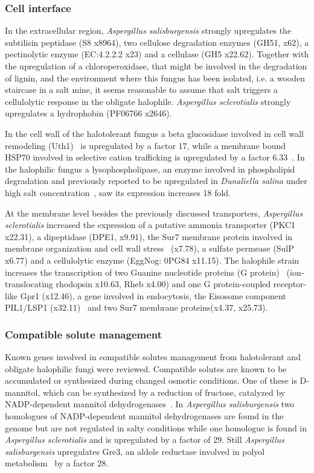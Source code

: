 \documentclass[jof,article,submit,moreauthors,pdftex,10pt,a4paper]{Definitions/mdpi}
\newcommand{\phiSp}{\textit{Aspergillus salisburgensis}}
\newcommand{\phiScl}{\textit{Aspergillus sclerotialis}}
\begin{document}
  
\subsubsection{Cell interface}

In the extracellular region, \phiSp{} strongly upregulates the subtilisin peptidase (S8 x8964), two cellulose degradation enzymes (GH51, x62), a pectinolytic enzyme (EC:4.2.2.2 x23) and a cellulase (GH5 x22.62). Together with the upregulation of a chloroperoxidase, that might be involved in the degradation of lignin, and the environment where this fungus has been isolated, i.e. a wooden staircase in a salt mine, it seems reasonable to assume that salt triggers a cellulolytic response in the obligate halophile. \phiScl{} strongly upregulates a hydrophobin (PF06766 x2646).

In the cell wall of the halotolerant fungus a beta glucosidase involved in cell wall remodeling (Uth1)~\cite{Kuznetsov2013} is upregulated by a factor 17, while a membrane bound HSP70 involved in selective cation trafficking is upregulated by a factor 6.33~\cite{Arispe2000}. In the halophilic fungus a lysophospholipase, an enzyme involved in phospholipid degradation and previously reported to be upregulated in \textit{Dunaliella salina} under high salt concentration~\cite{Katz2007}, saw its expression increases 18 fold.

At the membrane level besides the previously discussed transporters,  \phiScl{} increased the expression of a putative ammonia transporter (PKC1 x22.31), a dipeptidase (DPE1, x9.91), the Sur7 membrane protein involved in membrane organization and cell wall stress~\cite{Douglas2012} (x7.78), a sulfate permease (SulP x6.77) and a cellulolytic enzyme (EggNog: 0PG84 x11.15).
The halophile strain increases the transcription of two Guanine nucleotide proteins (G protein)~\cite{Vogler2008} (ion-translocating rhodopsin x10.63, Rheb x4.00) and one G protein-coupled receptor-like Gpr1 (x12.46), a gene involved in endocytosis, the Eisosome component PIL1/LSP1 (x32.11)~\cite{Walther2006} and two Sur7 membrane proteins(x4.37, x25.73).


\subsubsection{Compatible solute management}
 Known genes involved in compatible solutes management from halotolerant and obligate halophilic fungi were reviewed. Compatible solutes are known to be accumulated or synthesized during changed osmotic conditions.  One of these is D-mannitol, which can be synthesized by a reduction of fructose, catalyzed by NADP-dependent mannitol dehydrogenases~\cite{Zajc2013}. In \phiSp{} two homologues of NADP-dependent mannitol dehydrogenases are found in the genome but are not regulated in salty conditions while one homologue is found in \phiScl{} and is upregulated by a factor of 29. Still \phiSp{} upregulates Gre3, an aldole reductase involved in polyol metabolism~\cite{Saito2012} by a factor 28.
 
\end{document}

